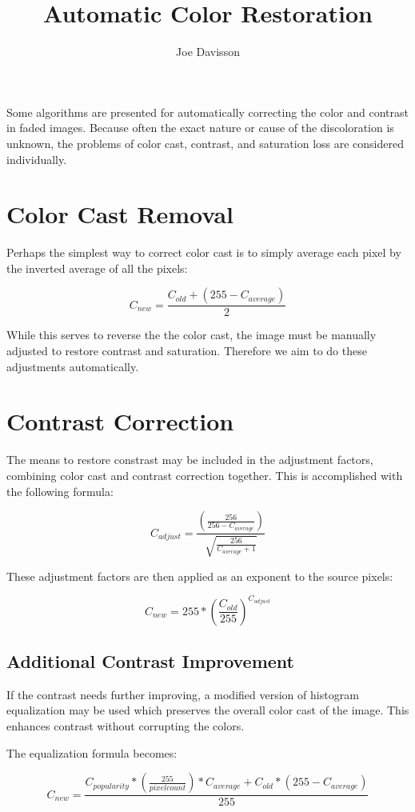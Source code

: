 \documentclass{article}
\title{Automatic Color Restoration}
\author{Joe Davisson} %
\begin{document}
\maketitle

Some algorithms are presented for automatically correcting the
color and contrast in faded images. Because often the exact nature or cause
of the discoloration is unknown, the problems of color cast, contrast, and
saturation loss are considered individually.

\section{Color Cast Removal}
Perhaps the simplest way to correct color cast is to simply average each
pixel by the inverted average of all the pixels:

\[ C_{new} = \frac{C_{old} + \left(255 - C_{average}\right) }{2} \]

While this serves to reverse the the color cast, the image must be manually
adjusted to restore contrast and saturation. Therefore we aim to do these
adjustments automatically.

\section{Contrast Correction}
The means to restore constrast may be included in the adjustment factors,
combining color cast and contrast correction together. This is accomplished
with the following formula:

\[ C_{adjust} = \frac{\left(\frac{256} {256 - C_{average}}\right)}
                     {\sqrt{\frac{256} { C_{average} + 1}}} \]

These adjustment factors are then applied as an exponent to the source pixels:

\[ C_{new} = 255 * \left(\frac{C_{old}}{255}\right) ^ {C_{adjust}} \]

\subsection{Additional Contrast Improvement}
If the contrast needs further improving, a modified version of histogram
equalization may be used which preserves the overall color cast of the image.
This enhances contrast without corrupting the colors.

The equalization formula becomes:

\[ C_{new} = \frac{C_{popularity} * \left(\frac{255}{pixel count}\right) * C_{average}
                   + C_{old} * \left(255 - C_{average}\right)}{255} \]
\end{document}
